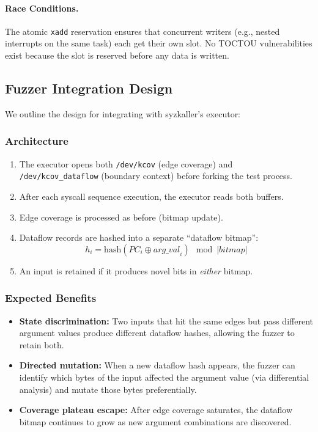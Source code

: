 \documentclass{ndss}
\begin{document}
\paragraph{Race Conditions.} The atomic \texttt{xadd} reservation ensures that
concurrent writers (e.g., nested interrupts on the same task) each get their
own slot. No TOCTOU vulnerabilities exist because the slot is reserved before
any data is written.

\subsection{Fuzzer Integration Design}\label{sec:fuzzer-design}

We outline the design for integrating \toolname{} with syzkaller's executor:

\subsubsection{Architecture}

\begin{enumerate}[nosep]
  \item The executor opens both \texttt{/dev/kcov} (edge coverage) and
        \texttt{/dev/kcov\_dataflow} (boundary context) before forking the
        test process.
  \item After each syscall sequence execution, the executor reads both buffers.
  \item Edge coverage is processed as before (bitmap update).
  \item Dataflow records are hashed into a separate ``dataflow bitmap'':
        \begin{equation}
          h_i = \mathrm{hash}(\mathit{PC}_i \oplus \mathit{arg\_val}_i) \mod |\mathit{bitmap}|
        \end{equation}
  \item An input is retained if it produces novel bits in \emph{either} bitmap.
\end{enumerate}

\subsubsection{Expected Benefits}

\begin{itemize}[nosep]
  \item \textbf{State discrimination:} Two inputs that hit the same edges but
        pass different argument values produce different dataflow hashes,
        allowing the fuzzer to retain both.
  \item \textbf{Directed mutation:} When a new dataflow hash appears, the
        fuzzer can identify which bytes of the input affected the argument
        value (via differential analysis) and mutate those bytes preferentially.
  \item \textbf{Coverage plateau escape:} After edge coverage saturates, the
        dataflow bitmap continues to grow as new argument combinations are
        discovered.
\end{itemize}
\end{document}
